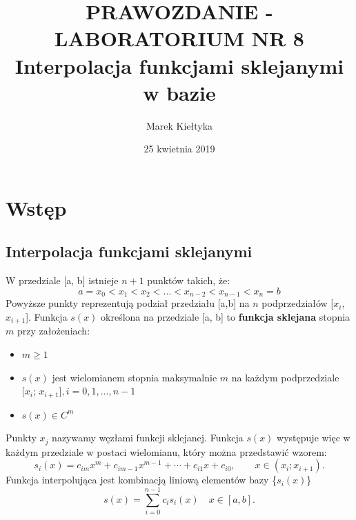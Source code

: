 

\renewcommand{\arraystretch}{1.2}

\title{\Large\vspace{-2.5cm}{\Huge S}PRAWOZDANIE - LABORATORIUM NR {\Huge8}\\
	\textbf{Interpolacja funkcjami sklejanymi w bazie} } 
\date{\Large25 kwietnia 2019}
\author{\Large Marek Kiełtyka}


\maketitle

\vspace{-1.2cm}\section{Wstęp}

\subsection{Interpolacja funkcjami sklejanymi}

W przedziale [a, b] istnieje $n+1$ punktów takich, że:
\begin{equation} 
\label{wezly}
a = x_0 < x_1 < x_2 < \dots < x_{n-2} < x_{n-1} < x_{n} = b
\end{equation}
Powyższe punkty reprezentują podział przedziału [a,b] na $n$ podprzedziałów 
[$x_i$,~$x_{i+1}$].
Funkcja $s(x)$ określona na przedziale [a, b] to \textbf{funkcja sklejana} stopnia $m$ przy założeniach:
\begin{itemize}
	\item $m \geq 1$
	\item $s(x)$ jest wielomianem stopnia maksymalnie $m$ na każdym podprzedziale $[x_i$; $x_{i+1}], i=0,1,...,n-1$
	\item  $s(x) \in C^{m}$
\end{itemize}
Punkty $x_j$ nazywamy węzłami funkcji sklejanej. Funkcja $s(x)$ występuje więc w każdym przedziale w postaci wielomianu, który można przedstawić wzorem:
\begin{equation}
s_i(x) = c_{im}x^m + c_{im-1}x^{m-1} + \cdots + c_{i1}x + c_{i0}, \qquad x \in (x_i; x_{i+1}).
\end{equation}
Funkcja interpolująca jest kombinacją liniową elementów bazy \{$s_i(x)$\}
\begin{equation}
s(x) = \sum_{i=0}^{n-1} c_i s_i (x) \quad x \in [a, b].
\end{equation}


